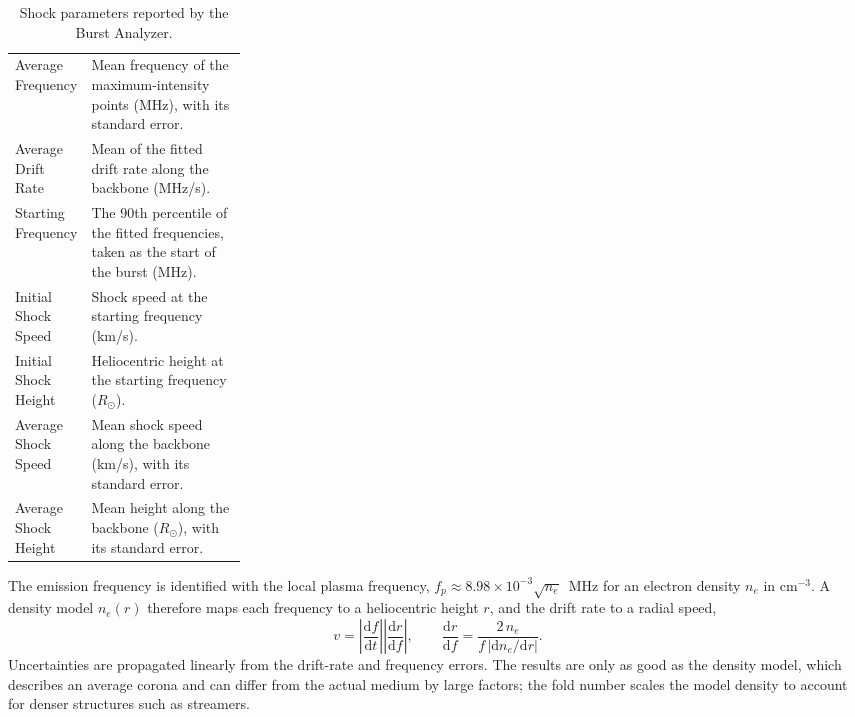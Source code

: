 \begin{table}[!htbp]
  \centering
  \caption{Shock parameters reported by the Burst Analyzer.}
  \label{tab:shock-params}
  \small
  \begin{tabularx}{\linewidth}{@{}P{0.27\linewidth}L@{}}
    \toprule
     &  \\
    \midrule
    Average Frequency & Mean frequency of the maximum-intensity points (MHz), with its standard error. \\
    Average Drift Rate & Mean of the fitted drift rate along the backbone (MHz/s). \\
    Starting Frequency & The 90th percentile of the fitted frequencies, taken as the start of the burst (MHz). \\
    Initial Shock Speed & Shock speed at the starting frequency (km/s). \\
    Initial Shock Height & Heliocentric height at the starting frequency (\(R_\odot\)). \\
    Average Shock Speed & Mean shock speed along the backbone (km/s), with its standard error. \\
    Average Shock Height & Mean height along the backbone (\(R_\odot\)), with its standard error. \\
    \bottomrule
  \end{tabularx}
\end{table}

\begin{background}
  The emission frequency is identified with the local plasma frequency,
  \(f_p \approx 8.98\times10^{-3}\sqrt{n_e}\)~MHz for an electron density \(n_e\) in
  cm\(^{-3}\). A density model \(n_e(r)\) therefore maps each frequency to a heliocentric
  height \(r\), and the drift rate to a radial speed,
  \begin{equation*}
    v = \left|\frac{\mathrm{d}f}{\mathrm{d}t}\right| \left|\frac{\mathrm{d}r}{\mathrm{d}f}\right|,
    \qquad \frac{\mathrm{d}r}{\mathrm{d}f} = \frac{2\,n_e}{f\,|\mathrm{d}n_e/\mathrm{d}r|}.
  \end{equation*}
  Uncertainties are propagated linearly from the drift-rate and frequency errors. The
  results are only as good as the density model, which describes an average corona and
  can differ from the actual medium by large factors; the fold number scales the model
  density to account for denser structures such as streamers.
\end{background}

